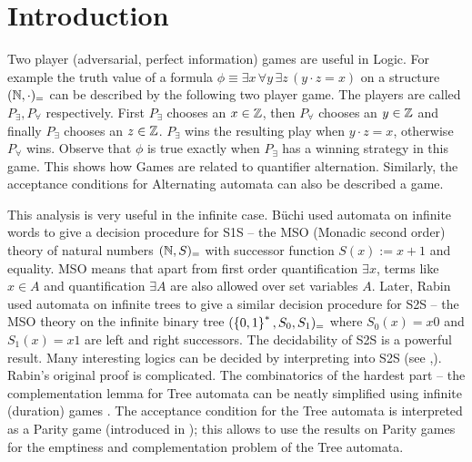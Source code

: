 \chapter{Introduction}

Two player (adversarial, perfect information) games are useful in Logic. For example the truth value of a formula $\phi \equiv \exists x \, \forall y \, \exists z \, (y \cdot z = x)$ on a structure $(\mathbb{N},\cdot)_=$ can be described by the following two player game. The players are called $P_\exists,P_\forall$ respectively. First $P_\exists$ chooses an $x \in \mathbb{Z}$, then $P_\forall$ chooses an $y \in \mathbb{Z}$ and finally $P_\exists$ chooses an $z \in \mathbb{Z}$. $P_\exists$ wins the resulting play when $y \cdot z = x$, otherwise $P_\forall$ wins. Observe that $\phi$ is true exactly when $P_\exists$ has a winning strategy in this game. This shows how Games are related to quantifier alternation. Similarly, the acceptance conditions for Alternating automata can also be described a game.

This analysis is very useful in the infinite case. B\"uchi \cite{richard_buchi_symposium_1966} used automata on infinite words to give a decision procedure for S1S  -- the MSO (Monadic second order) theory of natural numbers $(\mathbb{N},S)_=$ with successor function $S(x) := x+1$ and equality. MSO means that apart from first order quantification $\exists x$, terms like $x \in A$ and quantification $\exists A$ are also allowed over set variables $A$. Later, Rabin \cite{rabin_decidability_1969} used automata on infinite trees to give a similar decision procedure for S2S -- the MSO theory on the infinite binary tree $(\left\{0,1\right\}^*,S_0,S_1)_=$ where $S_0(x)=x0$ and $S_1(x)=x1$ are left and right successors. The decidability of S2S is a powerful result. Many interesting logics can be decided by interpreting into S2S (see \cite{rabin_decidability_1969},\cite[Chap~7]{classical_prob}). Rabin's original proof is complicated. The combinatorics of the hardest part -- the complementation lemma for Tree automata can be neatly simplified using infinite (duration) games \cite[Chap~8]{thomas2002automata}. The acceptance condition for the Tree automata is interpreted as a Parity game (introduced in ); this allows to use the results on Parity games for the emptiness and complementation problem of the Tree automata.

